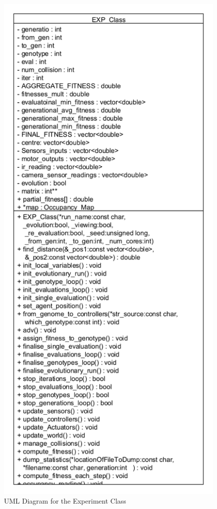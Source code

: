 \begin{figure}[h]
\centering
\includegraphics[scale=0.6]{Chapter2/images/exp_class_uml.png}
\caption{UML Diagram for the Experiment Class}
\label{fig:exp_uml}
\end{figure}


